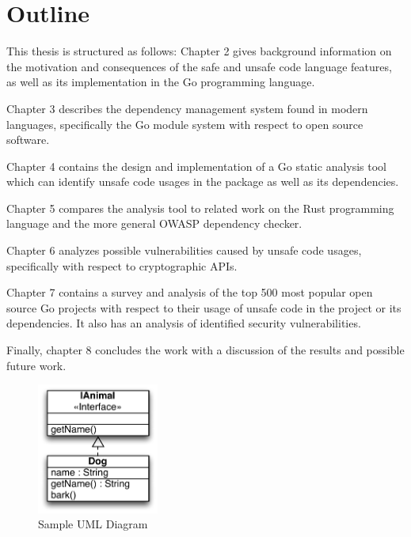 
\section{Outline}\label{sec:outline}

This thesis is structured as follows: Chapter 2 gives background information on the motivation
and consequences of the safe and unsafe code language features, as well as its implementation
in the Go programming language.

Chapter 3 describes the dependency management system found in modern languages, specifically
the Go module system with respect to open source software.

Chapter 4 contains the design and implementation of a Go static analysis tool which can identify
unsafe code usages in the package as well as its dependencies.

Chapter 5 compares the analysis tool to related work on the Rust programming language and the
more general OWASP dependency checker.

Chapter 6 analyzes possible vulnerabilities caused by unsafe code usages, specifically with
respect to cryptographic APIs.

Chapter 7 contains a survey and analysis of the top 500 most popular open source Go projects
with respect to their usage of unsafe code in the project or its dependencies. It also has an
analysis of identified security vulnerabilities.

Finally, chapter 8 concludes the work with a discussion of the results and possible future work.

\begin{figure}
\centering
\includegraphics[width=4cm]{assets/images/uml}
\caption{Sample UML Diagram}
\label{uml_example}
\end{figure}
